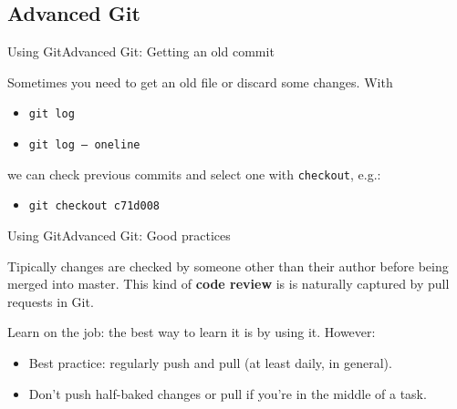 \documentclass[10pt,compress]{beamer} %
\begin{document}

\subsection{Advanced Git}
\begin{frame}{Using Git}{Advanced Git: Getting an old commit}

Sometimes you need to get an old file or discard some changes. With 

\begin{itemize}
 \item \texttt{git log} 
 \item \texttt{git log -- oneline}
\end{itemize}

we can check previous commits and select one with \texttt{checkout}, e.g.:
\begin{itemize}
 \item \texttt{git checkout c71d008}
\end{itemize}

\end{frame}


\begin{frame}{Using Git}{Advanced Git: Good practices}


Tipically changes are checked by someone other than their
author before being merged into master. This kind of \textbf{code review} is is naturally captured by pull requests in Git.

Learn on the job: the best way to learn it is by using it. However:
\begin{itemize}
  \item Best practice: regularly push and pull (at least daily, in general).
  \item Don't push half-baked changes or pull if you're in the middle of a task.
\end{itemize}

\end{frame}
\end{document}
